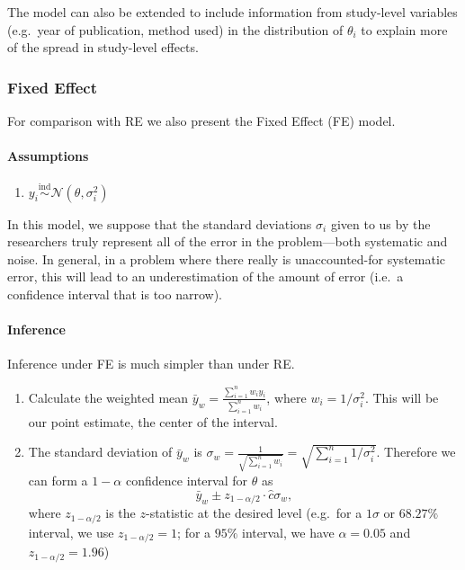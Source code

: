 \documentclass[12pt]{article}
\begin{document}
The model can also be extended to include information from study-level variables (e.g.~year of publication, method used) in the distribution of $\theta_i$ to explain more of the spread in study-level effects.

\subsubsection{Fixed Effect}

For comparison with RE we also present the Fixed Effect (FE) model.

\paragraph{Assumptions}\label{assumptions-1}

\begin{enumerate}
\item
  $y_i\overset{\mathrm{ind}}{\sim}\mathcal{N}(\theta,\sigma_i^2)$
\end{enumerate}

In this model, we suppose that the standard deviations $\sigma_i$ given to us by the researchers truly represent all of the error in the problem---both systematic and noise. In general, in a problem where there really is unaccounted-for systematic error, this will lead to an underestimation of the amount of error (i.e.~a confidence interval that is too narrow).

\paragraph{Inference}\label{inference-1}

Inference under FE is much simpler than under RE.

\begin{enumerate}
\item
  Calculate the weighted mean $\bar{y}_w=\frac{\sum_{i=1}^n w_iy_i}{\sum_{i=1}^nw_i}$, where $w_i=1/\sigma_i^2$. This will be our point estimate, the center of the interval.
\item
  The standard deviation of $\bar{y}_w$ is $\sigma_w=\frac{1}{\sqrt{\sum_{i=1}^nw_i}}=\sqrt{\sum_{i=1}^n1/\sigma_i^2}$. Therefore we can form a $1-\alpha$ confidence interval for $\theta$ as \[\bar{y}_w\pm z_{1-{\alpha/2}}\cdot \hat c\sigma_w,\] where $z_{1-\alpha/2}$ is the $z$-statistic at the desired level (e.g.~for a $1\sigma$ or $68.27\%$ interval, we use $z_{1-\alpha/2}=1$; for a $95\%$ interval, we have $\alpha=0.05$ and $z_{1-\alpha/2}=1.96$)
\end{enumerate}
\end{document}

